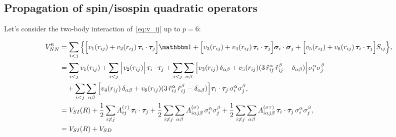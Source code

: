 \documentclass[aps,prc,twocolumn,superscriptaddress,showpacs,floatfix,nofootinbib]{revtex4-1}
\begin{document}
\subsection{Propagation of spin/isospin quadratic operators}
\label{sec:p2}
Let's consider the two-body interaction of~\cref{eq:v_ij} up to $p=6$:
\begin{widetext}
\begin{align}
V_{NN}^6&=\sum_{i<j}\Big\{	
 \Big[v_1(r_{ij})+v_2(r_{ij})\,\bm\tau_i\cdot\bm\tau_j\Big]\mathbbm1
+\Big[v_3(r_{ij})+v_4(r_{ij})\,\bm\tau_i\cdot\bm\tau_j\Big]\bm\sigma_i\cdot\bm\sigma_j
+\Big[v_5(r_{ij})+v_6(r_{ij})\,\bm\tau_i\cdot\bm\tau_j\Big]S_{ij}\Big\} , \nonumber \\
&=\sum_{i<j}v_1(r_{ij})+\sum_{i<j}\Big[v_2(r_{ij})\Big]\bm\tau_i\cdot\bm\tau_j
+\sum_{i<j}\sum_{\alpha\beta}\Big[v_3(r_{ij})\,\delta_{\alpha\beta}
+v_5(r_{ij})(3\,\hat{r}_{ij}^\alpha\,\hat{r}_{ij}^\beta-\delta_{\alpha\beta})\Big]\sigma_i^\alpha\sigma_j^\beta \nonumber \\ 
&\quad+\sum_{i<j}\sum_{\alpha\beta}\Big[v_4(r_{ij})\,\delta_{\alpha\beta}
+v_6(r_{ij})(3\,\hat{r}_{ij}^\alpha\,\hat{r}_{ij}^\beta-\delta_{\alpha\beta})\Big]\bm\tau_i\cdot\bm\tau_j\,\sigma_i^\alpha\sigma_j^\beta , \nonumber \\
&=V_{SI}(R)+{1\over2}\sum_{i\ne j}A^{(\tau)}_{ij}\,\bm\tau_i\cdot\bm\tau_j
+{1\over2}\sum_{i\ne j}\sum_{\alpha\beta}A^{(\sigma)}_{i\alpha j\beta}\,\sigma_i^{\alpha}\sigma_j^{\beta}
+{1\over2}\sum_{i\ne j}\sum_{\alpha\beta}A^{(\sigma\tau)}_{i\alpha j\beta} \,\bm\tau_i\cdot\bm\tau_j\,\sigma_i^{\alpha}\sigma_j^{\beta} , \nonumber \\
&=V_{SI}(R)+V_{SD} \, \label{eq:v_si+sd}
\end{align}
\end{widetext}
\end{document}
